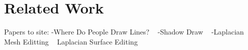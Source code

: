 \section{Related Work}

Papers to site:
-Where Do People Draw Lines? ~\cite{Cole:2008}
-Shadow Draw ~\cite{Lee:2011}
-Laplacian Mesh Editting ~\cite{Sorkine:2004}
Laplacian Surface Editing
